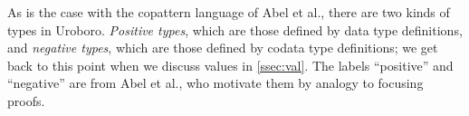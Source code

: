 %


As is the case with the copattern language of Abel et al.\cite{abel13copatterns}, there are two kinds of types in Uroboro. \textit{Positive types}, which are those defined by data type definitions, and \textit{negative types}, which are those defined by codata type definitions; we get back to this point when we discuss values in \autoref{ssec:val}. The labels ``positive'' and ``negative'' are from Abel et al., who motivate them by analogy to focusing proofs.

